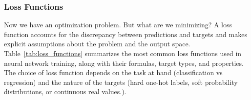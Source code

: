 \subsubsection{Loss Functions}

Now we have an optimization problem. But what are we minimizing? A loss function accounts for the discrepancy between predictions and targets and makes explicit assumptions about the problem and the output space. Table~\ref{tab:loss_functions} summarizes the most common loss functions used in neural network training, along with their formulas, target types, and properties. The choice of loss function depends on the task at hand (classification vs regression) and the nature of the targets (hard one-hot labels, soft probability distributions, or continuous real values.).
%
%
%
